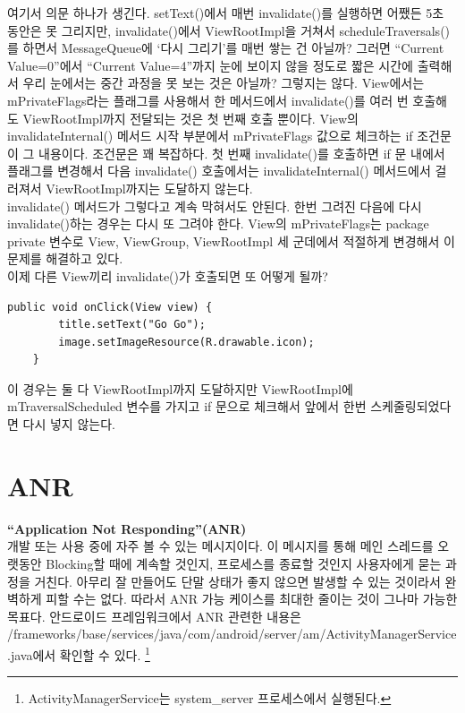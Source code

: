 여기서 의문 하나가 생긴다. 
setText()에서 매번 invalidate()를 실행하면 어쨌든 5초 동안은 못 그리지만, 
invalidate()에서 ViewRootImpl을 거쳐서 scheduleTraversals()를 하면서 MessageQueue에 `다시 그리기'를 매번 쌓는 건 아닐까? 
그러면 ``Current Value=0''에서 ``Current Value=4''까지 눈에 보이지 않을 정도로 짧은 시간에 출력해서 우리 눈에서는 중간 과정을 못 보는 것은 아닐까?
그렇지는 않다. View에서는 mPrivateFlags라는 플래그를 사용해서 한 메서드에서 invalidate()를 여러 번 호출해도 ViewRootImpl까지 전달되는 것은 첫 번째 호출 뿐이다. View의 invalidateInternal() 메서드 시작 부분에서 mPrivateFlags 값으로 체크하는 if 조건문이 그 내용이다.
조건문은 꽤 복잡하다. 첫 번째 invalidate()를 호출하면 if 문 내에서 플래그를 변경해서 다음 invalidate() 호출에서는 invalidateInternal() 메서드에서 걸러져서 ViewRootImpl까지는 도달하지 않는다.\\

invalidate() 메서드가 그렇다고 계속 막혀서도 안된다. 
한번 그려진 다음에 다시 invalidate()하는 경우는 다시 또 그려야 한다.
View의 mPrivateFlags는 package private 변수로 View, ViewGroup, ViewRootImpl 세 군데에서 적절하게 변경해서 이 문제를 해결하고 있다.\\

이제 다른 View끼리 invalidate()가 호출되면 또 어떻게 될까?
\begin{lstlisting}[frame=single] 
	public void onClick(View view) {
		title.setText("Go Go");
		image.setImageResource(R.drawable.icon);
	}
\end{lstlisting}
이 경우는 둘 다 ViewRootImpl까지 도달하지만 ViewRootImpl에 mTraversalScheduled 변수를 가지고 if 문으로 체크해서 앞에서 한번 스케줄링되었다면 다시 넣지 않는다.

\section{ANR}
\textbf{``Application Not Responding''(ANR)}\\
개발 또는 사용 중에 자주 볼 수 있는 메시지이다. 이 메시지를 통해 메인 스레드를 오랫동안 Blocking할 때에 계속할 것인지, 프로세스를 종료할 것인지 사용자에게 묻는 과정을 거친다. 
아무리 잘 만들어도 단말 상태가 좋지 않으면 발생할 수 있는 것이라서 완벽하게 피할 수는 없다. 따라서 ANR 가능 케이스를 최대한 줄이는 것이 그나마 가능한 목표다.
안드로이드 프레임워크에서 ANR 관련한 내용은 
/frameworks/base/services/java/com/android/server/am/ActivityManagerService.java에서 확인할 수 있다. \footnote{ActivityManagerService는 system\_server 프로세스에서 실행된다.}\\

